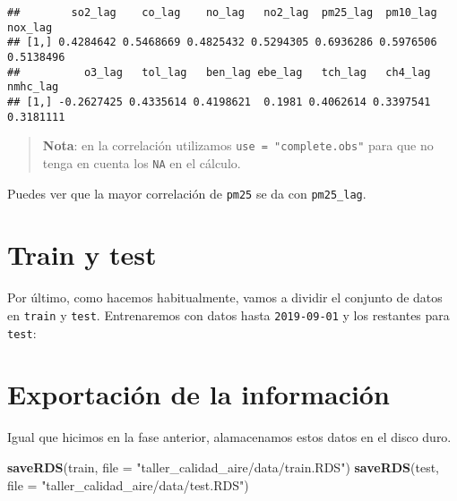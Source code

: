 \documentclass[]{article}
\newenvironment{Shaded}{\begin{snugshade}}{\end{snugshade}}
\newcommand{\DataTypeTok}[1]{\textcolor[rgb]{0.13,0.29,0.53}{#1}}
\newcommand{\KeywordTok}[1]{\textcolor[rgb]{0.13,0.29,0.53}{\textbf{#1}}}
\newcommand{\NormalTok}[1]{#1}
\newcommand{\OperatorTok}[1]{\textcolor[rgb]{0.81,0.36,0.00}{\textbf{#1}}}
\newcommand{\StringTok}[1]{\textcolor[rgb]{0.31,0.60,0.02}{#1}}
\begin{document}
\begin{verbatim}
##        so2_lag    co_lag    no_lag   no2_lag  pm25_lag  pm10_lag   nox_lag
## [1,] 0.4284642 0.5468669 0.4825432 0.5294305 0.6936286 0.5976506 0.5138496
##          o3_lag   tol_lag   ben_lag ebe_lag   tch_lag   ch4_lag  nmhc_lag
## [1,] -0.2627425 0.4335614 0.4198621  0.1981 0.4062614 0.3397541 0.3181111
\end{verbatim}

\begin{quote}
\textbf{Nota}: en la correlación utilizamos
\texttt{use\ =\ "complete.obs"} para que no tenga en cuenta los
\texttt{NA} en el cálculo.
\end{quote}

Puedes ver que la mayor correlación de \texttt{pm25} se da con
\texttt{pm25\_lag}.

\hypertarget{train-y-test}{%
\section{Train y test}\label{train-y-test}}

Por último, como hacemos habitualmente, vamos a dividir el conjunto de
datos en \texttt{train} y \texttt{test}. Entrenaremos con datos hasta
\texttt{2019-09-01} y los restantes para \texttt{test}:

\begin{Shaded}
\end{Shaded}

\hypertarget{exportaciuxf3n-de-la-informaciuxf3n}{%
\section{Exportación de la
información}\label{exportaciuxf3n-de-la-informaciuxf3n}}

Igual que hicimos en la fase anterior, alamacenamos estos datos en el
disco duro.

\begin{Shaded}
\begin{Highlighting}[]
\KeywordTok{saveRDS}\NormalTok{(train, }\DataTypeTok{file =} \StringTok{"taller_calidad_aire/data/train.RDS"}\NormalTok{)}
\KeywordTok{saveRDS}\NormalTok{(test, }\DataTypeTok{file =} \StringTok{"taller_calidad_aire/data/test.RDS"}\NormalTok{)}
\end{Highlighting}
\end{Shaded}
\end{document}
